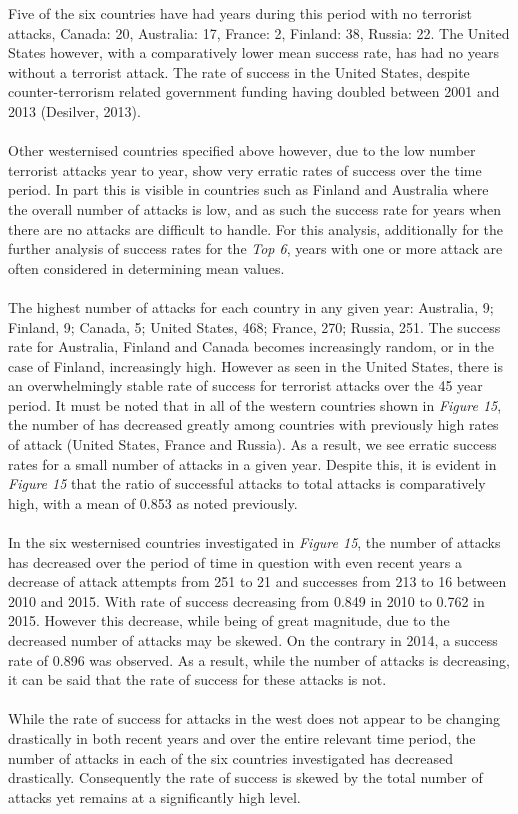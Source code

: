 \documentclass[10pt,a4paper]{article}
\begin{document}
Five of the six countries have had years during this period with no terrorist attacks, Canada: 20, Australia: 17, France: 2, Finland: 38, Russia: 22. The United States however, with a comparatively lower mean success rate, has had no years without a terrorist attack. The rate of success in the United States, despite counter-terrorism related government funding having doubled between 2001 and 2013 (Desilver, 2013).
\\\\
Other westernised countries specified above however, due to the low number terrorist attacks year to year, show very erratic rates of success over the time period.
In part this is visible in countries such as Finland and Australia where the overall number of attacks is low, and as such the success rate for years when there are no attacks are difficult to handle.
For this analysis, additionally for the further analysis of success rates for the \textit{Top 6}, years with one or more attack are often considered in determining mean values. 
\\\\
The highest number of attacks for each country in any given year: Australia, 9; Finland, 9; Canada, 5; United States, 468; France, 270; Russia, 251. The success rate for Australia, Finland and Canada becomes increasingly random, or in the case of Finland, increasingly high. However as seen in the United States, there is an overwhelmingly stable rate of success for terrorist attacks over the 45 year period. It must be noted that in all of the western countries shown in \textit{Figure 15}, the number of has decreased greatly among countries with previously high rates of attack (United States, France and Russia). As a result, we see erratic success rates for a small number of attacks in a given year. Despite this, it is evident in \textit{Figure 15} that the ratio of successful attacks to total attacks is comparatively high, with a mean of 0.853 as noted previously.
\\\\
In the six westernised countries investigated in \textit{Figure 15}, the number of attacks has decreased over the period of time in question with even recent years a decrease of attack attempts from 251 to 21 and successes from 213 to 16 between 2010 and 2015. With rate of success decreasing from 0.849 in 2010 to 0.762 in 2015. However this decrease, while being of great magnitude, due to the decreased number of attacks may be skewed. On the contrary in 2014, a success rate of 0.896 was observed. As a result, while the number of attacks is decreasing, it can be said that the rate of success for these attacks is not.
\\\\
While the rate of success for attacks in the west does not appear to be changing drastically in both recent years and over the entire relevant time period, the number of attacks in each of the six countries investigated has decreased drastically. Consequently the rate of success is skewed by the total number of attacks yet remains at a significantly high level.
\end{document}
